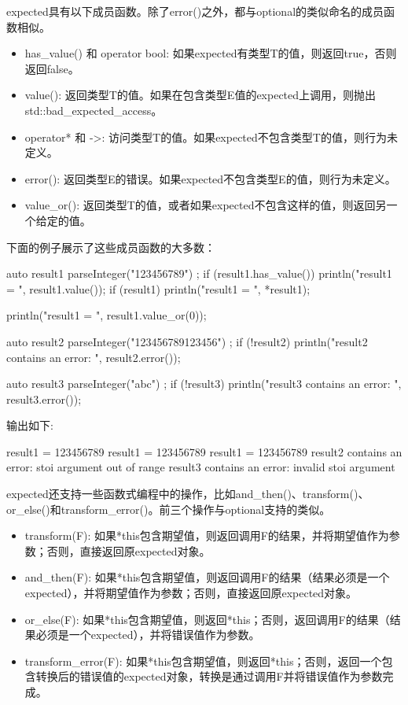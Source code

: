 expected具有以下成员函数。除了error()之外，都与optional的类似命名的成员函数相似。

\begin{itemize}
\item
has\_value() 和 operator bool: 如果expected有类型T的值，则返回true，否则返回false。

\item
value(): 返回类型T的值。如果在包含类型E值的expected上调用，则抛出std::bad\_expected\_access。

\item
operator* 和 ->: 访问类型T的值。如果expected不包含类型T的值，则行为未定义。

\item
error(): 返回类型E的错误。如果expected不包含类型E的值，则行为未定义。

\item
value\_or(): 返回类型T的值，或者如果expected不包含这样的值，则返回另一个给定的值。
\end{itemize}

下面的例子展示了这些成员函数的大多数：

\begin{cpp}
auto result1 { parseInteger("123456789") };
if (result1.has_value()) { println("result1 = {}", result1.value()); }
if (result1) { println("result1 = {}", *result1); }

println("result1 = {}", result1.value_or(0));

auto result2 { parseInteger("123456789123456") };
if (!result2) { println("result2 contains an error: {}", result2.error()); }

auto result3 { parseInteger("abc") };
if (!result3) { println("result3 contains an error: {}", result3.error()); }
\end{cpp}

输出如下:

\begin{shell}
result1 = 123456789
result1 = 123456789
result1 = 123456789
result2 contains an error: stoi argument out of range
result3 contains an error: invalid stoi argument
\end{shell}

expected还支持一些函数式编程中的操作，比如and\_then()、transform()、or\_else()和transform\_error()。前三个操作与optional支持的类似。

\begin{itemize}
\item
transform(F): 如果*this包含期望值，则返回调用F的结果，并将期望值作为参数；否则，直接返回原expected对象。

\item
and\_then(F): 如果*this包含期望值，则返回调用F的结果（结果必须是一个expected），并将期望值作为参数；否则，直接返回原expected对象。

\item
or\_else(F): 如果*this包含期望值，则返回*this；否则，返回调用F的结果（结果必须是一个expected），并将错误值作为参数。

\item
transform\_error(F): 如果*this包含期望值，则返回*this；否则，返回一个包含转换后的错误值的expected对象，转换是通过调用F并将错误值作为参数完成。
\end{itemize}

